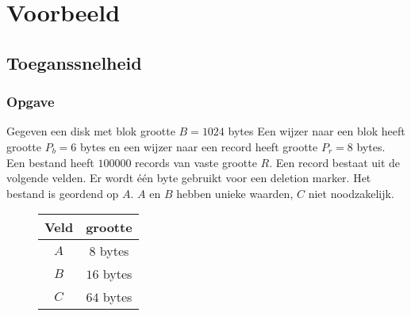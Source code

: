 \documentclass[indexstructuren.tex]{subfiles}
\begin{document}
\chapter{Voorbeeld}
\renewcommand\thesection{V\arabic{section}}
\renewcommand\thesubsection{V\arabic{section}}
\section{Toeganssnelheid}
\subsection*{Opgave}
Gegeven een disk met blok grootte $B=1024$ bytes Een wijzer naar een blok heeft grootte $P_{b} = 6$ bytes en een wijzer naar een record heeft grootte $P_{r} = 8$ bytes. Een bestand heeft $100000$ records van vaste grootte $R$. Een record bestaat uit de volgende velden. Er wordt \'e\'en byte gebruikt voor een deletion marker. Het bestand is geordend op $A$. $A$ en $B$ hebben unieke waarden, $C$ niet noodzakelijk.
\begin{figure}[H]
\centering
\begin{tabular}{c|c}
Veld & grootte\\\hline
$A$ & $8$ bytes\\
$B$ & $16$ bytes\\
$C$ & $64$ bytes\\
\end{tabular}
\end{figure}
\end{document}
